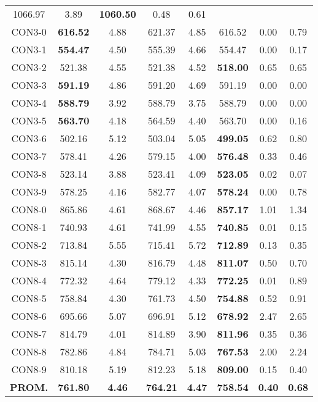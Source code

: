 \begin{table}[h]
\begin{tabular}{c c c c c c c c}
1066.97 & 3.89 & \bf{1060.50} & 
0.48 & 0.61\\CON3-0 & \bf{616.52} & 4.88 & 
621.37 & 4.85 & 616.52 & 0.00
 & 0.79\\CON3-1 & \bf{554.47} & 4.50 & 
555.39 & 4.66 & 554.47 & 0.00
 & 0.17\\CON3-2 & 521.38 & 4.55 & 
521.38 & 4.52 & \bf{518.00} & 
0.65 & 0.65\\CON3-3 & \bf{591.19} & 4.86 & 
591.20 & 4.69 & 591.19 & 0.00
 & 0.00\\CON3-4 & \bf{588.79} & 3.92 & 
588.79 & 3.75 & 588.79 & 0.00
 & 0.00\\
CON3-5 & \bf{563.70} & 4.18 & 
564.59 & 4.40 & 563.70 & 0.00
 & 0.16\\CON3-6 & 502.16 & 5.12 & 
503.04 & 5.05 & \bf{499.05} & 
0.62 & 0.80\\CON3-7 & 578.41 & 4.26 & 
579.15 & 4.00 & \bf{576.48} & 
0.33 & 0.46\\CON3-8 & 523.14 & 3.88 & 
523.41 & 4.09 & \bf{523.05} & 
0.02 & 0.07\\CON3-9 & 578.25 & 4.16 & 
582.77 & 4.07 & \bf{578.24} & 
0.00 & 0.78\\CON8-0 & 865.86 & 4.61 & 
868.67 & 4.46 & \bf{857.17} & 
1.01 & 1.34\\CON8-1 & 740.93 & 4.61 & 
741.99 & 4.55 & \bf{740.85} & 
0.01 & 0.15\\CON8-2 & 713.84 & 5.55 & 
715.41 & 5.72 & \bf{712.89} & 
0.13 & 0.35\\CON8-3 & 815.14 & 4.30 & 
816.79 & 4.48 & \bf{811.07} & 
0.50 & 0.70\\CON8-4 & 772.32 & 4.64 & 
779.12 & 4.33 & \bf{772.25} & 
0.01 & 0.89\\CON8-5 & 758.84 & 4.30 & 
761.73 & 4.50 & \bf{754.88} & 
0.52 & 0.91\\CON8-6 & 695.66 & 5.07 & 
696.91 & 5.12 & \bf{678.92} & 
2.47 & 2.65\\CON8-7 & 814.79 & 4.01 & 
814.89 & 3.90 & \bf{811.96} & 
0.35 & 0.36\\CON8-8 & 782.86 & 4.84 & 
784.71 & 5.03 & \bf{767.53} & 
2.00 & 2.24\\CON8-9 & 810.18 & 5.19 & 
812.23 & 5.18 & \bf{809.00} & 
0.15 & 0.40\\\bf{PROM.} & 
\bf{761.80} & \bf{4.46} & \bf{764.21} & \bf{4.47} & \bf{758.54} & \bf{0.40} & \bf{0.68}\\[1ex]\hline
\end{tabular}
\label{table:nonlin}
\end{table}
\clearpage
